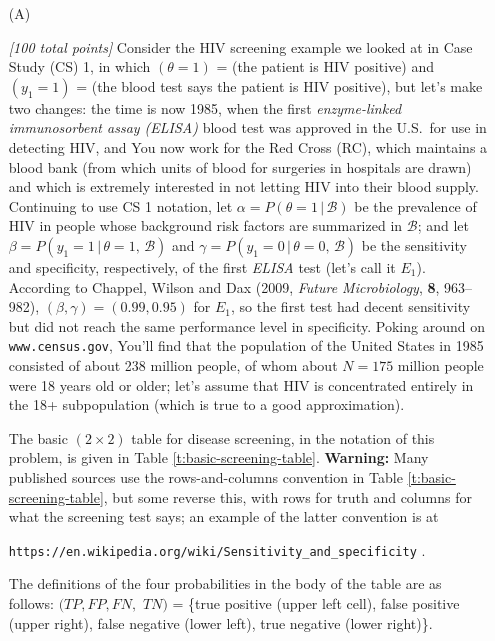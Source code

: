 \documentclass[12pt]{article}
\newcommand{\given}{\, | \,}
\begin{document}
\begin{itemize}

\item[(A)]

\textit{[100 total points]} Consider the HIV screening example we looked at in Case Study (CS) 1, in which $( \theta = 1 )$ = (the patient is HIV positive) and $( y_1 = 1 )$ = (the blood test says the patient is HIV positive), but let's make two changes: the time is now 1985, when the first \textit{enzyme-linked immunosorbent assay (ELISA)} blood test was approved in the U.S.~for use in detecting HIV, and You now work for the Red Cross (RC), which maintains a blood bank (from which units of blood for surgeries in hospitals are drawn) and which is extremely interested in not letting HIV into their blood supply. Continuing to use CS 1 notation, let $\alpha = P ( \theta = 1 \given \mathcal{ B } )$ be the prevalence of HIV in people whose background risk factors are summarized in $\mathcal{ B }$; and let $\beta = P ( y_1 = 1 \given \theta = 1 , \, \mathcal{ B } )$ and $\gamma = P ( y_1 = 0 \given \theta = 0 , \, \mathcal{ B })$ be the sensitivity and specificity, respectively, of the first \textit{ELISA} test (let's call it $E_1$). According to Chappel, Wilson and Dax (2009, \textit{Future Microbiology}, \textbf{8}, 963--982), $( \beta, \gamma ) = ( 0.99, 0.95 )$ for $E_1$, so the first test had decent sensitivity but did not reach the same performance level in specificity. Poking around on \texttt{www.census.gov}, You'll find that the population of the United States in 1985 consisted of about 238 million people, of whom about $N = 175$ million people were 18 years old or older; let's assume that HIV is concentrated entirely in the 18+ subpopulation (which is true to a good approximation). 

The basic $( 2 \times 2 )$ table for disease screening, in the notation of this problem, is given in Table \ref{t:basic-screening-table}. \textbf{Warning:} Many published sources use the rows-and-columns convention in Table \ref{t:basic-screening-table}, but some reverse this, with rows for truth and columns for what the screening test says; an example of the latter convention is at 

\hspace*{0.25in} \texttt{https://en.wikipedia.org/wiki/Sensitivity\_and\_specificity} . 

The definitions of the four probabilities in the body of the table are as follows: $( TP, FP, FN,$ $TN )$ = \{true positive (upper left cell), false positive (upper right), false negative (lower left), true negative (lower right)\}.


\end{itemize}
\end{document}
